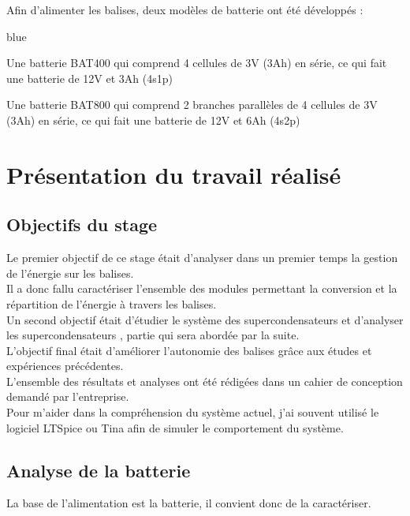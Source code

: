 Afin d'alimenter les balises, deux modèles de batterie ont été développés : 

\begin{items}{blue}{\Circle}
 \item Une batterie BAT400 qui comprend 4 cellules de 3V (3Ah) en série, ce qui fait une batterie de 12V et 3Ah (4s1p)
 \item Une batterie BAT800 qui comprend 2 branches parallèles de 4 cellules de 3V (3Ah) en série, ce qui fait une batterie de 12V et 6Ah (4s2p)
 \end{items}
\chapter{Présentation du travail réalisé}

\section{Objectifs du stage}

Le premier objectif de ce stage était d'analyser dans un premier temps la gestion de l'énergie sur les balises. \\ 
Il a donc fallu caractériser l'ensemble des modules permettant la conversion et la répartition de l'énergie à travers les balises.\\

Un second objectif était d'étudier le système des supercondensateurs et d'analyser les supercondensateurs , partie qui sera abordée par la suite.\\

L'objectif final était d'améliorer l'autonomie des balises grâce aux études et expériences précédentes.\\

L'ensemble des résultats et analyses ont été rédigées dans un cahier de conception demandé par l'entreprise.\\
Pour m'aider dans la compréhension du système actuel, j'ai souvent utilisé le logiciel LTSpice ou Tina afin de simuler le comportement du système.







\section{Analyse de la batterie}

La base de l'alimentation est la batterie, il convient donc de la caractériser.

